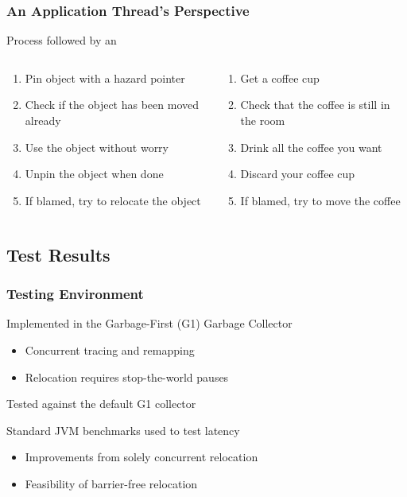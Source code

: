 \documentclass{beamer}
\newcommand{\linespace}{\vskip 0.25cm}
\begin{document}
\begin{frame}

\frametitle{An Application Thread's Perspective}

Process followed by an \color{red}{application thread}\color{black}
\linespace

\begin{columns}
\begin{column}{0.5\textwidth}
\begin{enumerate}
\item Pin object with a hazard pointer
\item Check if the object has been moved already
\item Use the object without worry
\item Unpin the object when done
\item If blamed, try to relocate the object
\end{enumerate}
\end{column}

\begin{column}{0.5\textwidth}
\begin{enumerate}
\item Get a coffee cup
\item Check that the coffee is still in the room
\item Drink all the coffee you want
\item Discard your coffee cup
\item If blamed, try to move the coffee
\end{enumerate}
\end{column}
\end{columns}

\end{frame}



\subsection*{Test Results}

\begin{frame}

\frametitle{Testing Environment}

Implemented in the Garbage-First (G1) Garbage Collector
\begin{itemize}
\item Concurrent tracing and remapping
\item Relocation requires stop-the-world pauses
\end{itemize}

\linespace
\linespace

Tested against the default G1 collector

\linespace
\linespace

Standard JVM benchmarks used to test latency
\begin{itemize}
\item Improvements from solely concurrent relocation
\item Feasibility of barrier-free relocation
\end{itemize}

\end{frame}
\end{document}
